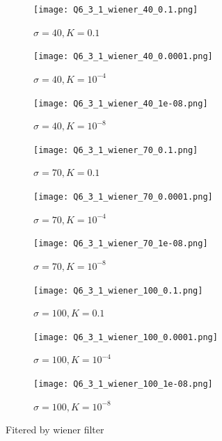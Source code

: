 \documentclass[
	12pt, %
]{style/fphw}
\begin{document}
	\begin{figure}[H]
			\begin{subfigure}[b]{0.3\linewidth}
				\centering
				\texttt{[image: Q6\_3\_1\_wiener\_40\_0.1.png]}
				\caption{$\sigma = 40, K = 0.1$}
				\label{Q6_3_1_wiener_40_0.1}
			\end{subfigure}
			\hfill
			\begin{subfigure}[b]{0.3\linewidth}
				\centering
				\texttt{[image: Q6\_3\_1\_wiener\_40\_0.0001.png]}
				\caption{$\sigma = 40, K = 10^{-4}$}
				\label{Q6_3_1_wiener_40_0.0001}
			\end{subfigure}
			\hfill
			\begin{subfigure}[b]{0.3\linewidth}
				\centering
				\texttt{[image: Q6\_3\_1\_wiener\_40\_1e-08.png]}
				\caption{$\sigma = 40, K = 10^{-8}$}
				\label{Q6_3_1_wiener_40_1e-08}
			\end{subfigure}
		\vfill
			\begin{subfigure}[b]{0.3\linewidth}
				\centering
				\texttt{[image: Q6\_3\_1\_wiener\_70\_0.1.png]}
				\caption{$\sigma = 70, K = 0.1$}
				\label{Q6_3_1_wiener_70_0.1}
			\end{subfigure}
			\hfill
			\begin{subfigure}[b]{0.3\linewidth}
				\centering
				\texttt{[image: Q6\_3\_1\_wiener\_70\_0.0001.png]}
				\caption{$\sigma = 70, K = 10^{-4}$}
				\label{Q6_3_1_wiener_70_0.0001}
			\end{subfigure}
			\hfill
			\begin{subfigure}[b]{0.3\linewidth}
				\centering
				\texttt{[image: Q6\_3\_1\_wiener\_70\_1e-08.png]}
				\caption{$\sigma = 70, K = 10^{-8}$}
				\label{Q6_3_1_wiener_70_1e-08}
			\end{subfigure}
		\vfill
			\begin{subfigure}[b]{0.3\linewidth}
				\centering
				\texttt{[image: Q6\_3\_1\_wiener\_100\_0.1.png]}
				\caption{$\sigma = 100, K = 0.1$}
				\label{Q6_3_1_wiener_100_0.1}
			\end{subfigure}
			\hfill
			\begin{subfigure}[b]{0.3\linewidth}
				\centering
				\texttt{[image: Q6\_3\_1\_wiener\_100\_0.0001.png]}
				\caption{$\sigma = 100, K = 10^{-4}$}
				\label{Q6_3_1_wiener_100_0.0001.png}
			\end{subfigure}
			\hfill
			\begin{subfigure}[b]{0.3\linewidth}
				\centering
				\texttt{[image: Q6\_3\_1\_wiener\_100\_1e-08.png]}
				\caption{$\sigma = 100, K = 10^{-8}$}
				\label{Q6_3_1_wiener_100_1e-08}
			\end{subfigure}
		\caption{Fitered by wiener filter}
		\label{Motion wiener filter}
	\end{figure}
\end{document}
